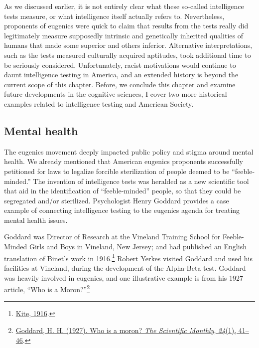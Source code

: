 \documentclass[
  oneside,
  12pt]{crumpbook}
\begin{document}
As we discussed earlier, it is not entirely clear what these so-called intelligence tests measure, or what intelligence itself actually refers to. Nevertheless, proponents of eugenics were quick to claim that results from the tests really did legitimately measure supposedly intrinsic and genetically inherited qualities of humans that made some superior and others inferior. Alternative interpretations, such as the tests measured culturally acquired aptitudes, took additional time to be seriously considered. Unfortunately, racist motivations would continue to daunt intelligence testing in America, and an extended history is beyond the current scope of this chapter. Before, we conclude this chapter and examine future developments in the cognitive sciences, I cover two more historical examples related to intelligence testing and American Society.

\hypertarget{mental-health}{%
\subsection{Mental health}\label{mental-health}}

The eugenics movement deeply impacted public policy and stigma around mental health. We already mentioned that American eugenics proponents successfully petitioned for laws to legalize forcible sterilization of people deemed to be ``feeble-minded.'' The invention of intelligence tests was heralded as a new scientific tool that aid in the identification of ``feeble-minded'' people, so that they could be segregated and/or sterilized. Psychologist Henry Goddard provides a case example of connecting intelligence testing to the eugenics agenda for treating mental health issues.

Goddard was Director of Research at the Vineland Training School for Feeble-Minded Girls and Boys in Vineland, New Jersey; and had published an English translation of Binet's work in 1916.\footnote{\protect\hyperlink{ref-kiteDevelopmentIntelligenceChildren1916}{Kite, 1916}.} Robert Yerkes visited Goddard and used his facilities at Vineland, during the development of the Alpha-Beta test. Goddard was heavily involved in eugenics, and one illustrative example is from his 1927 article, ``Who is a Moron?''\footnote{\protect\hyperlink{ref-goddardWhoMoron1927}{Goddard, H. H. (1927). Who is a moron? \emph{The Scientific Monthly}, \emph{24}(1), 41--46}.}
\end{document}
